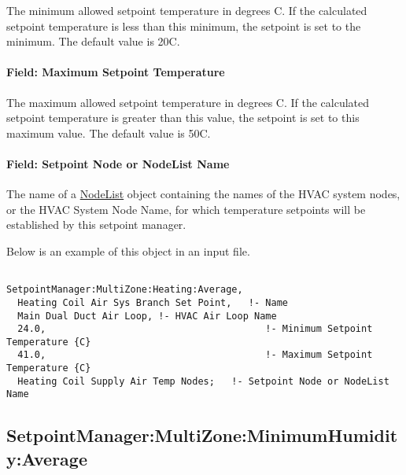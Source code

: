 The minimum allowed setpoint temperature in degrees C. If the calculated setpoint temperature is less than this minimum, the setpoint is set to the minimum. The default value is 20C.

\paragraph{Field: Maximum Setpoint Temperature}\label{field-maximum-setpoint-temperature-5}

The maximum allowed setpoint temperature in degrees C. If the calculated setpoint temperature is greater than this value, the setpoint is set to this maximum value. The default value is 50C.

\paragraph{Field: Setpoint Node or NodeList Name}\label{field-setpoint-node-or-nodelist-name-14}

The name of a \hyperref[nodelist]{NodeList} object containing the names of the HVAC system nodes, or the HVAC System Node Name, for which temperature setpoints will be established by this setpoint manager.

Below is an example of this object in an input file.

\begin{lstlisting}

SetpointManager:MultiZone:Heating:Average,
  Heating Coil Air Sys Branch Set Point,   !- Name
  Main Dual Duct Air Loop, !- HVAC Air Loop Name
  24.0,                                       !- Minimum Setpoint Temperature {C}
  41.0,                                       !- Maximum Setpoint Temperature {C}
  Heating Coil Supply Air Temp Nodes;   !- Setpoint Node or NodeList Name
\end{lstlisting}

\subsection{SetpointManager:MultiZone:MinimumHumidity:Average}\label{setpointmanagermultizoneminimumhumidityaverage}

